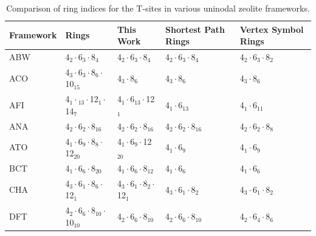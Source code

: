 \documentclass[11pt]{article}
\begin{document}
\begin{table}
\centering
\begin{threeparttable}
\caption{Comparison of ring indices for the T-sites in various uninodal zeolite frameworks. \label{tab:uninodal}}
{\scriptsize
\begin{tabular}{lllll}
\hline
Framework & Rings & This Work & Shortest Path Rings \cite{sastre-topological-2009} & Vertex Symbol Rings \cite{baerlocher-database-nodate}\\
\hline
ABW & 4\(_{\text{2}} \cdot\)6\(_{\text{3}} \cdot\)8\(_{\text{4}}\) & 4\(_{\text{2}} \cdot\)6\(_{\text{3}} \cdot\)8\(_{\text{4}}\) & 4\(_{\text{2}} \cdot\)6\(_{\text{3}} \cdot\)8\(_{\text{4}}\) & 4\(_{\text{2}} \cdot\)6\(_{\text{3}} \cdot\)8\(_{\text{2}}\)\\
ACO & 4\(_{\text{3}} \cdot\)6\(_{\text{3}} \cdot\)8\(_{\text{6}} \cdot\)10\(_{\text{15}}\) & 4\(_{\text{3}} \cdot\)8\(_{\text{6}}\) & 4\(_{\text{3}} \cdot\)8\(_{\text{6}}\) & 4\(_{\text{3}} \cdot\)8\(_{\text{6}}\)\\
AFI & 4\(_{\text{1}} \cdot\)\(_{\text{13}} \cdot\)12\(_{\text{1}} \cdot\)14\(_{\text{7}}\) & 4\(_{\text{1}} \cdot\)6\(_{\text{13}} \cdot\)12\(_{\text{1}}\) & 4\(_{\text{1}} \cdot\)6\(_{\text{13}}\) & 4\(_{\text{1}} \cdot\)6\(_{\text{11}}\)\\
ANA & 4\(_{\text{2}} \cdot\)6\(_{\text{2}} \cdot\)8\(_{\text{16}}\) & 4\(_{\text{2}} \cdot\)6\(_{\text{2}} \cdot\)8\(_{\text{16}}\) & 4\(_{\text{2}} \cdot\)6\(_{\text{2}} \cdot\)8\(_{\text{16}}\) & 4\(_{\text{2}} \cdot\)6\(_{\text{2}} \cdot\)8\(_{\text{8}}\)\\
ATO & 4\(_{\text{1}} \cdot\)6\(_{\text{9}} \cdot\)8\(_{\text{8}} \cdot\)12\(_{\text{20}}\) & 4\(_{\text{1}} \cdot\)6\(_{\text{9}} \cdot\)12\(_{\text{20}}\) & 4\(_{\text{1}} \cdot\)6\(_{\text{9}}\) & 4\(_{\text{1}} \cdot\)6\(_{\text{9}}\)\\
BCT & 4\(_{\text{1}} \cdot\)6\(_{\text{6}} \cdot\)8\(_{\text{20}}\) & 4\(_{\text{1}} \cdot\)6\(_{\text{6}} \cdot\)8\(_{\text{12}}\) & 4\(_{\text{1}} \cdot\)6\(_{\text{6}}\) & 4\(_{\text{1}} \cdot\)6\(_{\text{6}}\)\\
CHA & 4\(_{\text{3}} \cdot\)6\(_{\text{1}} \cdot\)8\(_{\text{6}} \cdot\)12\(_{\text{1}}\) & 4\(_{\text{3}} \cdot\)6\(_{\text{1}} \cdot\)8\(_{\text{2}} \cdot\)12\(_{\text{1}}\) & 4\(_{\text{3}} \cdot\)6\(_{\text{1}} \cdot\)8\(_{\text{2}}\) & 4\(_{\text{3}} \cdot\)6\(_{\text{1}} \cdot\)8\(_{\text{2}}\)\\
DFT & 4\(_{\text{2}} \cdot\)6\(_{\text{6}} \cdot\)8\(_{\text{10}} \cdot\)10\(_{\text{10}}\) & 4\(_{\text{2}} \cdot\)6\(_{\text{6}} \cdot\)8\(_{\text{10}}\) & 4\(_{\text{2}} \cdot\)6\(_{\text{6}} \cdot\)8\(_{\text{10}}\) & 4\(_{\text{2}} \cdot\)6\(_{\text{4}} \cdot\)8\(_{\text{6}}\)\\

\end{tabular}}
\end{threeparttable}
\end{table}
\end{document}
